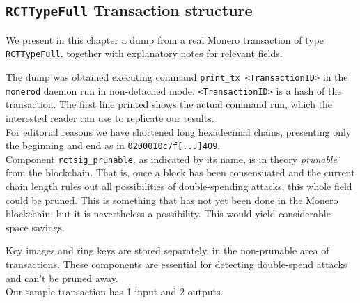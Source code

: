 

\begin{appendices}

\renewcommand{\theFancyVerbLine}{%
	\textcolor{red}{\small
		\arabic{FancyVerbLine}}}
	
	
\chapter{{\tt RCTTypeFull} Transaction structure}
\label{appendix:RCTTypeFull}

We present in this chapter a dump from a real Monero transaction of type {\tt RCTTypeFull}, 
together with explanatory notes for relevant fields.

The dump was obtained executing command {\tt print\_tx <TransactionID>} in the {\tt monerod} daemon run in non-detached mode. {\tt <TransactionID>} is a hash of the transaction. The first line printed shows the actual command run, which the interested reader can use to replicate our results.%
\\

For editorial reasons we have shortened long hexadecimal chains, presenting only the beginning and end as in {\tt 0200010c7f[...]409}.
\\

Component {\tt rctsig\_prunable}, as indicated by its name, is in theory {\sl prunable} from the blockchain. That is, once a block has been consensuated and the current chain length rules out all possibilities of double-spending attacks, this whole field could be pruned. This is something that has not yet been done in the Monero blockchain, but it is nevertheless a possibility. This would yield considerable space savings. 

Key images and ring keys are stored separately, in the non-prunable area of transactions. These components are essential for detecting double-spend attacks and can’t be pruned away.
\\

Our sample transaction has 1 input and 2 outputs.



\end{appendices}
